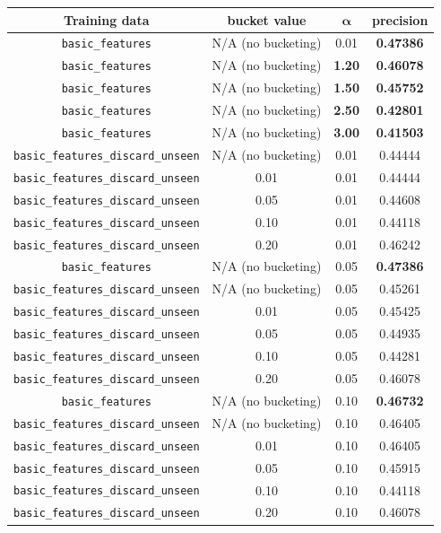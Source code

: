 \documentclass{article}
\begin{document}
{\small\begin{tabular}{|c|c|c|c|}\hline
Training data & bucket value & $\bm{\alpha}$ & precision\\\hline
\texttt{basic\_features} & N/A (no bucketing) & 0.01 & \textbf{0.47386}\\
\texttt{basic\_features} & N/A (no bucketing) & \textbf{1.20} & \textbf{0.46078}\\
\texttt{basic\_features} & N/A (no bucketing) & \textbf{1.50} & \textbf{0.45752}\\
\texttt{basic\_features} & N/A (no bucketing) & \textbf{2.50} & \textbf{0.42801}\\\hline\hline
\texttt{basic\_features} & N/A (no bucketing) & \textbf{3.00} & \textbf{0.41503}\\\hline\hline

\texttt{basic\_features\_discard\_unseen} & N/A (no bucketing) & 0.01 & 0.44444\\
\texttt{basic\_features\_discard\_unseen} & 0.01 & 0.01 & 0.44444\\
\texttt{basic\_features\_discard\_unseen} & 0.05 & 0.01 & 0.44608\\
\texttt{basic\_features\_discard\_unseen} & 0.10 & 0.01 & 0.44118\\
\texttt{basic\_features\_discard\_unseen} & 0.20 & 0.01 & 0.46242\\\hline

\texttt{basic\_features} & N/A (no bucketing) & 0.05 & \textbf{0.47386}\\
\texttt{basic\_features\_discard\_unseen} & N/A (no bucketing) & 0.05 & 0.45261\\
\texttt{basic\_features\_discard\_unseen} & 0.01 & 0.05 & 0.45425\\
\texttt{basic\_features\_discard\_unseen} & 0.05 & 0.05 & 0.44935\\
\texttt{basic\_features\_discard\_unseen} & 0.10 & 0.05 & 0.44281\\
\texttt{basic\_features\_discard\_unseen} & 0.20 & 0.05 & 0.46078\\\hline

\texttt{basic\_features} & N/A (no bucketing) & 0.10 & \textbf{0.46732}\\
\texttt{basic\_features\_discard\_unseen} & N/A (no bucketing) & 0.10 & 0.46405\\
\texttt{basic\_features\_discard\_unseen} & 0.01 & 0.10 & 0.46405\\
\texttt{basic\_features\_discard\_unseen} & 0.05 & 0.10 & 0.45915\\
\texttt{basic\_features\_discard\_unseen} & 0.10 & 0.10 & 0.44118\\
\texttt{basic\_features\_discard\_unseen} & 0.20 & 0.10 & 0.46078\\\hline
\end{tabular}}\par\bigskip
\end{document}
